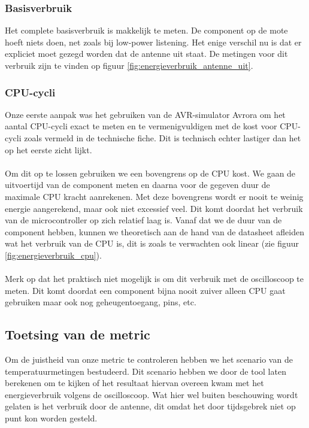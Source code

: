 \documentclass[11pt]{article}
\begin{document}
\subsubsection{Basisverbruik}

Het complete basisverbruik is makkelijk te meten. De component op de mote hoeft
niets doen, net zoals bij low-power listening. Het enige verschil nu is dat er
expliciet moet gezegd worden dat de antenne uit staat.
De metingen voor dit verbruik zijn te vinden op figuur \ref{fig:energieverbruik_antenne_uit}.

\subsubsection{CPU-cycli}

Onze eerste aanpak was het gebruiken van de AVR-simulator Avrora
\cite{titzer2005avrora} om het aantal CPU-cycli exact te meten en te
vermenigvuldigen met de kost voor CPU-cycli zoals vermeld in de technische
fiche. Dit is technisch echter lastiger dan het op het eerste zicht lijkt.
\\
\\
Om dit op te lossen gebruiken we een bovengrens op de CPU kost. We gaan de
uitvoertijd van de component meten en daarna voor de gegeven duur de maximale
CPU kracht aanrekenen. Met deze bovengrens wordt er nooit te weinig energie
aangerekend, maar ook niet excessief veel. Dit komt doordat het verbruik van de
microcontroller op zich relatief laag is. Vanaf dat we de duur van de
component hebben, kunnen we theoretisch aan de hand van de datasheet afleiden
wat het verbruik van de CPU is, dit is zoals te verwachten ook linear (zie figuur
\ref{fig:energieverbruik_cpu}).\\
\\
Merk op dat het praktisch niet mogelijk is om dit verbruik met de oscilloscoop te meten.
Dit komt doordat een component bijna nooit zuiver alleen CPU gaat gebruiken maar ook nog geheugentoegang, pins, etc. 

\subsection{Toetsing van de metric}

Om de juistheid van onze metric te controleren hebben we het scenario van de
temperatuurmetingen bestudeerd. Dit scenario hebben we door de tool laten
berekenen om te kijken of het resultaat hiervan overeen kwam met het
energieverbruik volgens de oscilloscoop. Wat hier wel buiten beschouwing
wordt gelaten is het verbruik door de antenne, dit omdat het door tijdsgebrek niet op punt kon worden gesteld.
\end{document}
